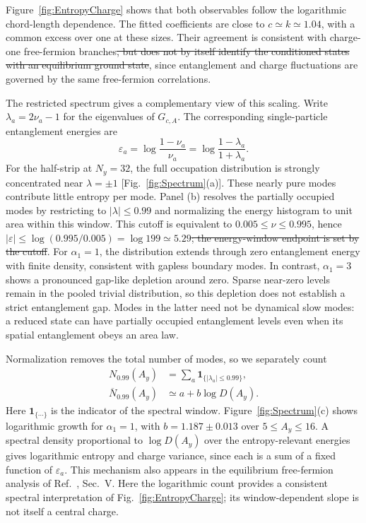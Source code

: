 \documentclass[aps,prb,10pt,twocolumn,superscriptaddress,longbibliography,floatfix]{revtex4-2}
\newcommand{\claudeadd}[1]{{\color{orange}#1}}
\newcommand{\claudedel}[1]{{\color{orange}\sout{#1}}}
\begin{document}
{\color{blue}
Figure~\ref{fig:EntropyCharge} shows that both observables follow the logarithmic chord-length dependence. The fitted coefficients are close to $c\simeq k\simeq1.04$, with a common excess over one at these sizes. Their agreement is consistent with charge-one free-fermion branches\claudedel{, but does not by itself identify the conditioned states with an equilibrium ground state}\claudeadd{, since entanglement and charge fluctuations are governed by the same free-fermion correlations}.

The restricted spectrum gives a complementary view of this scaling. Write $\lambda_a=2\nu_a-1$ for the eigenvalues of $G_{c,A}$. The corresponding single-particle entanglement energies are
\begin{equation}
 \varepsilon_a=\log\frac{1-\nu_a}{\nu_a}
 =\log\frac{1-\lambda_a}{1+\lambda_a}.
 \label{eq:EntanglementEnergies}
\end{equation}
For the half-strip at $N_y=32$, the full occupation distribution is strongly concentrated near $\lambda=\pm1$ [Fig.~\ref{fig:Spectrum}(a)]. These nearly pure modes contribute little entropy per mode. Panel (b) resolves the partially occupied modes by restricting to $|\lambda|\leq0.99$ and normalizing the energy histogram to unit area within this window. This cutoff is equivalent to $0.005\leq\nu\leq0.995$, hence $|\varepsilon|\leq\log(0.995/0.005)=\log199\simeq5.29$\claudedel{; the energy-window endpoint is set by the cutoff}. For $\alpha_1=1$, the distribution extends through zero entanglement energy with finite density, consistent with gapless boundary modes. In contrast, $\alpha_1=3$ shows a pronounced gap-like depletion around zero. Sparse near-zero levels remain in the pooled trivial distribution, so this depletion does not establish a strict entanglement gap. Modes in the latter need not be dynamical slow modes: a reduced state can have partially occupied entanglement levels even when its spatial entanglement obeys an area law.

Normalization removes the total number of modes, so we separately count
\begin{align}
 N_{0.99}(A_y)&=\sum_a\mathbf1_{\{|\lambda_a|\leq0.99\}},\nonumber\\
 \overline N_{0.99}(A_y)&\simeq a+b\log D(A_y).
 \label{eq:WindowCount}
\end{align}
Here $\mathbf1_{\{\cdots\}}$ is the indicator of the spectral window. Figure~\ref{fig:Spectrum}(c) shows logarithmic growth for $\alpha_1=1$, with $b=1.187\pm0.013$ over $5\leq A_y\leq16$. A spectral density proportional to $\log D(A_y)$ over the entropy-relevant energies gives logarithmic entropy and charge variance, since each is a sum of a fixed function of $\varepsilon_a$. This mechanism also appears in the equilibrium free-fermion analysis of Ref.~\cite{EislerPeschel2010}, Sec.~V. Here the logarithmic count provides a consistent spectral interpretation of Fig.~\ref{fig:EntropyCharge}; its window-dependent slope is not itself a central charge.
}
\end{document}

